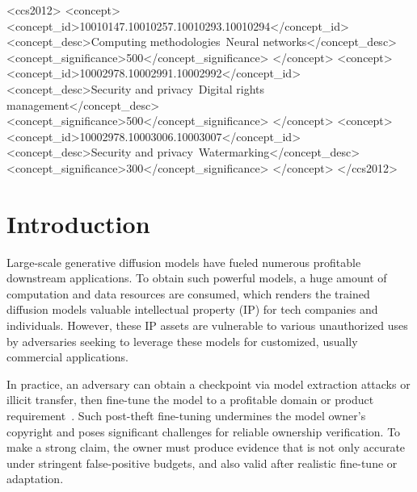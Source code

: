 \documentclass[sigconf, review, anonymous]{acmart}
\begin{document}
\begin{CCSXML}
<ccs2012>
 <concept>
  <concept_id>10010147.10010257.10010293.10010294</concept_id>
  <concept_desc>Computing methodologies~Neural networks</concept_desc>
  <concept_significance>500</concept_significance>
 </concept>
 <concept>
  <concept_id>10002978.10002991.10002992</concept_id>
  <concept_desc>Security and privacy~Digital rights management</concept_desc>
  <concept_significance>500</concept_significance>
 </concept>
 <concept>
  <concept_id>10002978.10003006.10003007</concept_id>
  <concept_desc>Security and privacy~Watermarking</concept_desc>
  <concept_significance>300</concept_significance>
 </concept>
</ccs2012>
\end{CCSXML}


\maketitle

\section{Introduction}
\label{sec:intro}

Large-scale generative diffusion models have fueled numerous profitable downstream applications.
To obtain such powerful models, a huge amount of computation and data resources are consumed, which renders the trained diffusion models valuable intellectual property (IP) for tech companies and individuals.
However, these IP assets are vulnerable to various unauthorized uses by adversaries seeking to leverage these models for customized, usually commercial applications.

In practice, an adversary can obtain a checkpoint via model extraction attacks or illicit transfer, then fine-tune the model to a profitable domain or product requirement~\cite{wang2025sleepermark,kim2024wouaf}.
Such post-theft fine-tuning undermines the model owner's copyright and poses significant challenges for reliable ownership verification.
To make a strong claim, the owner must produce evidence that is not only accurate under stringent false-positive budgets,
and also valid after realistic fine-tune or adaptation.
\end{document}
